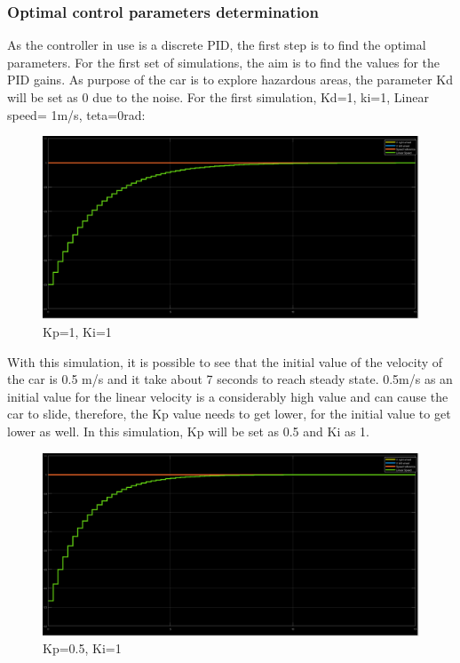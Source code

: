 \subsubsection{Optimal control parameters determination}

As the controller in use is a discrete PID, the first step is to find the optimal parameters.
For the first set of simulations, the aim is to find the values for the PID gains. As purpose of the car is to explore hazardous areas, the parameter Kd will be set as 0 due to the noise. 
For the first simulation, Kd=1, ki=1, Linear speed= 1m/s, teta=0rad:
\begin{figure}[!h]
\centering
\includegraphics[width=1.0\textwidth]{./img/pid11.png}
\caption {\label{fig:pid1 - p1i1}Kp=1, Ki=1}
\end{figure}
With this simulation, it is possible to see that the initial value of the velocity of the car is 0.5 m/s and it take about 7 seconds to reach steady state. 0.5m/s as an initial value for the linear velocity is a considerably high value and can cause the car to slide, therefore, the Kp value needs to get lower, for the initial value to get lower as well.
\newpage
In this simulation, Kp will be set as 0.5 and Ki as 1.
\begin{figure}[!h]
\centering
\includegraphics[width=1.0\textwidth]{./img/pid051.png}
\caption {\label{fig:pid1 - p05i1}Kp=0.5, Ki=1}
\end{figure}
